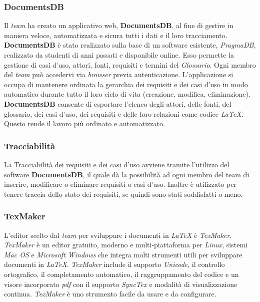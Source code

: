 \subsubsection{DocumentsDB}
Il \textit{team} ha creato un applicativo web, \textbf{DocumentsDB}, al fine di gestire in maniera veloce, automatizzata 
e sicura tutti i dati e il loro tracciamento. \textbf{DocumentsDB} è stato realizzato sulla base di un software esistente, \textit{PragmaDB}, realizzato da
studenti di anni passati e disponibile online. Esso permette la gestione di casi d'uso, attori, fonti, requisiti e termini del \textit{Glossario}. 
Ogni membro del \textit{team} può accedervi via \textit{browser} previa autenticazione.
L'applicazione si occupa di mantenere ordinata la gerarchia dei requisiti e dei casi d'uso in modo automatico durante tutto il loro ciclo di vita (creazione, modifica, eliminazione).
\textbf{DocumentsDB} consente di esportare l'elenco degli attori, delle fonti, del glossario, dei casi d'uso, dei requisiti e delle loro relazioni come codice \textit{\LaTeX{}}.
Questo rende il lavoro più ordinato e automatizzato.

\subsubsection{Tracciabilità}
La Tracciabilità dei requisiti e dei casi d'uso avviene tramite l'utilizzo del software \textbf{DocumentsDB}, il quale dà la possibilità ad ogni membro del team di inserire, modificare o eliminare requisiti o casi d'uso. 
Inoltre è utilizzato per tenere traccia dello stato dei requisiti, se quindi sono stati soddisfatti o meno.

\subsubsection{TexMaker}
L'editor scelto dal \textit{team} per sviluppare i documenti in \textit{\LaTeX{}} è \textit{TexMaker}.  
\textit{TexMaker} è un editor gratuito, moderno e multi-piattaforma per \textit{Linux}, sistemi \textit{Mac OS} e \textit{Microsoft Windows} che integra molti strumenti utili per sviluppare documenti in \textit{\LaTeX{}}.
\textit{TexMaker} include il supporto \textit{Unicode}, il controllo ortografico, il completamento automatico, il raggruppamento del codice e un visore incorporato \textit{pdf} con il supporto \textit{SyncTex} e modalità di visualizzazione continua.
\textit{TexMaker} è uno strumento facile da usare e da configurare.

